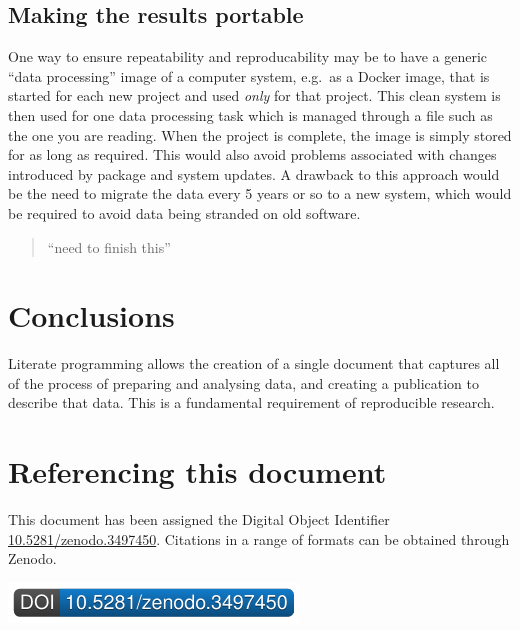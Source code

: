 \documentclass[11pt,]{article}
\begin{document}
\hypertarget{making-the-results-portable}{%
\subsection{Making the results portable}\label{making-the-results-portable}}

One way to ensure repeatability and reproducability may be to have a generic ``data processing'' image of a computer system, e.g.~as a Docker image, that is started for each new project and used \emph{only} for that project. This clean system is then used for one data processing task which is managed through a file such as the one you are reading. When the project is complete, the image is simply stored for as long as required. This would also avoid problems associated with changes introduced by package and system updates. A drawback to this approach would be the need to migrate the data every 5 years or so to a new system, which would be required to avoid data being stranded on old software.

\begin{quote}
``need to finish this''
\end{quote}

\hypertarget{conclusions}{%
\section{Conclusions}\label{conclusions}}

Literate programming allows the creation of a single document that captures all of the process of preparing and analysing data, and creating a publication to describe that data. This is a fundamental requirement of reproducible research.

\hypertarget{referencing-this-document}{%
\section*{Referencing this document}\label{referencing-this-document}}

This document has been assigned the Digital Object Identifier \href{http://dx.doi.org/10.5281/zenodo.3497450}{10.5281/zenodo.3497450}. Citations in a range of formats can be obtained through Zenodo.

\href{https://doi.org/10.5281/zenodo.3497450}{\includegraphics{DOIBadge3497450.pdf}}
\end{document}
